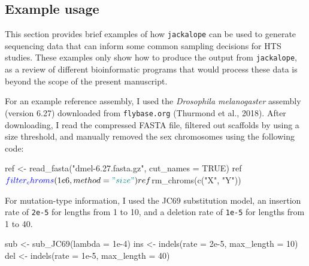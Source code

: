 \documentclass[12pt,]{article}
\newenvironment{Shaded}{}{}
\newcommand{\DataTypeTok}[1]{#1}
\newcommand{\DecValTok}[1]{#1}
\newcommand{\FloatTok}[1]{#1}
\newcommand{\KeywordTok}[1]{\textcolor[rgb]{0.00,0.00,1.00}{#1}}
\newcommand{\NormalTok}[1]{#1}
\newcommand{\OperatorTok}[1]{#1}
\newcommand{\OtherTok}[1]{\textcolor[rgb]{1.00,0.25,0.00}{#1}}
\newcommand{\StringTok}[1]{\textcolor[rgb]{0.00,0.50,0.50}{#1}}
\begin{document}
\hypertarget{example-usage}{%
\subsection{Example usage}\label{example-usage}}

This section provides brief examples of how \texttt{jackalope} can be used
to generate sequencing data that can inform some common sampling decisions for HTS
studies.
These examples only show how to produce the output from \texttt{jackalope}, as
a review of different bioinformatic programs that would process these data
is beyond the scope of the present manuscript.

For an example reference assembly, I used the \emph{Drosophila melanogaster} assembly
(version 6.27) downloaded from \texttt{flybase.org} (Thurmond et al., 2018).
After downloading, I read the compressed FASTA file, filtered out
scaffolds by using a size threshold, and manually removed the sex chromosomes
using the following code:

\begin{Shaded}
\begin{Highlighting}[]
\NormalTok{ref <-}\StringTok{ }\KeywordTok{read_fasta}\NormalTok{(}\StringTok{"dmel-6.27.fasta.gz"}\NormalTok{, }\DataTypeTok{cut_names =} \OtherTok{TRUE}\NormalTok{)}
\NormalTok{ref}\OperatorTok{$}\KeywordTok{filter_chroms}\NormalTok{(}\FloatTok{1e6}\NormalTok{, }\DataTypeTok{method =} \StringTok{"size"}\NormalTok{)}
\NormalTok{ref}\OperatorTok{$}\KeywordTok{rm_chroms}\NormalTok{(}\KeywordTok{c}\NormalTok{(}\StringTok{"X"}\NormalTok{, }\StringTok{"Y"}\NormalTok{))}
\end{Highlighting}
\end{Shaded}

For mutation-type information, I used the JC69 substitution model,
an insertion rate of \texttt{2e-5} for lengths from 1 to 10,
and
a deletion rate of \texttt{1e-5} for lengths from 1 to 40.

\begin{Shaded}
\begin{Highlighting}[]
\NormalTok{sub <-}\StringTok{ }\KeywordTok{sub_JC69}\NormalTok{(}\DataTypeTok{lambda =} \FloatTok{1e-4}\NormalTok{)}
\NormalTok{ins <-}\StringTok{ }\KeywordTok{indels}\NormalTok{(}\DataTypeTok{rate =} \FloatTok{2e-5}\NormalTok{, }\DataTypeTok{max_length =} \DecValTok{10}\NormalTok{)}
\NormalTok{del <-}\StringTok{ }\KeywordTok{indels}\NormalTok{(}\DataTypeTok{rate =} \FloatTok{1e-5}\NormalTok{, }\DataTypeTok{max_length =} \DecValTok{40}\NormalTok{)}
\end{Highlighting}
\end{Shaded}
\end{document}

